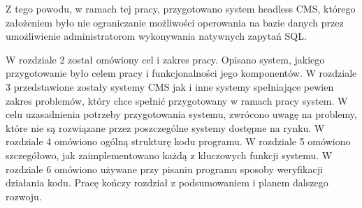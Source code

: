 Z tego powodu, w ramach tej pracy, przygotowano system headless CMS, którego
założeniem było nie ograniczanie możliwości operowania na bazie danych przez
umożliwienie administratorom wykonywania natywnych zapytań SQL.

\vspace{.5cm}

W rozdziale 2 został omówiony cel i zakres pracy. Opisano system, jakiego
przygotowanie było celem pracy i funkcjonalności jego komponentów. W rozdziale 3
przedstawione zostały systemy CMS jak i inne systemy spełniające pewien zakres
problemów, który chce spełnić przygotowany w ramach pracy system. W celu
uzasadnienia potrzeby przygotowania systemu, zwrócono uwagę na problemy, które
nie są rozwiązane przez poszczególne systemy dostępne na rynku. W rozdziale 4
omówiono ogólną strukturę kodu programu. W rozdziale 5 omówiono szczegółowo, jak
zaimplementowano każdą z kluczowych funkcji systemu. W rozdziale 6 omówiono
używane przy pisaniu programu sposoby weryfikacji działania kodu. Pracę kończy
rozdział z podsumowaniem i planem dalszego rozwoju.

